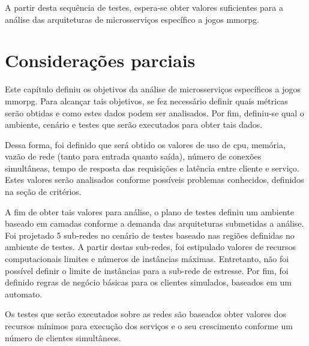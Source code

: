 A partir desta sequência de testes, espera-se obter valores suficientes para a análise das arquiteturas de microsserviços específico a jogos \ac{mmorpg}.



\section{Considerações parciais}


Este capítulo definiu os objetivos da análise de microsserviços específicos a jogos \ac{mmorpg}.
%
Para alcançar tais objetivos, se fez necessário definir quais métricas serão obtidas e como estes dados podem ser analisados.
%
Por fim, definiu-se qual o ambiente, cenário e testes que serão executados para obter tais dados.

Dessa forma, foi definido que será obtido os valores de uso de \ac{cpu}, memória, vazão de rede (tanto para entrada quanto saída), número de conexões simultâneas, tempo de resposta das requisições e latência entre cliente e serviço.
%
Estes valores serão analisados conforme possíveis problemas conhecidos, definidos na seção de critérios.

A fim de obter tais valores para análise, o plano de testes definiu um ambiente baseado em camadas conforme a demanda das arquiteturas submetidas a análise.
%
Foi projetado 5 sub-redes no cenário de testes baseado nas regiões definidas no ambiente de testes.
%
A partir destas sub-redes, foi estipulado valores de recursos computacionais limites e números de instâncias máximas.
%
Entretanto, não foi possível definir o limite de instâncias para a sub-rede de estresse.
%
Por fim, foi definido regras de negócio básicas para os clientes simulados, baseados em um automato.

Os testes que serão executados sobre as redes são baseados obter valores dos recursos mínimos para execução dos serviços e o seu crescimento conforme um número de clientes simultâneos.

%

